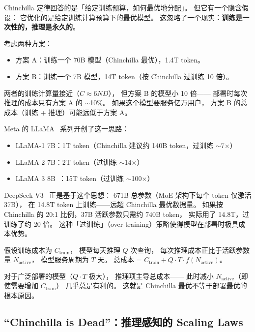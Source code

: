 Chinchilla 定律回答的是「给定训练预算，如何最优地分配」。
但它有一个隐含假设：
它优化的是给定训练计算预算下的最优模型。
这忽略了一个现实：\textbf{训练是一次性的，推理是永久的}。

考虑两种方案：
\begin{itemize}[noitemsep]
  \item 方案 A：训练一个 70B 模型（Chinchilla 最优），1.4T token。
  \item 方案 B：训练一个 7B 模型，14T token（按 Chinchilla 过训练 10 倍）。
\end{itemize}
两者的训练计算量接近（$C \approx 6ND$），
但方案 B 的模型小 10 倍——
部署时每次推理的成本只有方案 A 的 $\sim$10\%。
如果这个模型要服务亿万用户，
方案 B 的总成本（训练 + 推理）可能远低于方案 A。

Meta 的 LLaMA~\cite{touvron2023llama} 系列开创了这一思路：
\begin{itemize}[noitemsep]
  \item LLaMA-1 7B：1T token（Chinchilla 建议约 140B token，过训练 $\sim$7$\times$）
  \item LLaMA 2 7B：2T token（过训练 $\sim$14$\times$）
  \item LLaMA 3 8B~\cite{dubey2024llama3}：15T token（过训练 $\sim$100$\times$）
\end{itemize}

DeepSeek-V3~\cite{deepseekv3} 正是基于这个思想：
671B 总参数（MoE 架构下每个 token 仅激活 37B），
在 14.8T token 上训练——远超 Chinchilla 最优数据量。
如果按 Chinchilla 的 20:1 比例，37B 活跃参数只需约 740B token，
实际用了 14.8T，过训练了约 20 倍。
这种「过训练」（over-training）策略使得模型在部署时极具成本优势。

\begin{corebox}
假设训练成本为 $C_{\mathrm{train}}$，
模型每天推理 $Q$ 次查询，
每次推理成本正比于活跃参数量 $N_{\mathrm{active}}$，
模型服务周期为 $T$ 天。
总成本 =
$C_{\mathrm{train}} + Q \cdot T \cdot f(N_{\mathrm{active}})$。

对于广泛部署的模型（$Q \cdot T$ 极大），
推理项主导总成本——
此时减小 $N_{\mathrm{active}}$（即使需要增加 $C_{\mathrm{train}}$）
几乎总是有利的。
这就是 Chinchilla 最优不等于部署最优的根本原因。
\end{corebox}

\subsection{``Chinchilla is Dead''：推理感知的 Scaling Laws}
\label{sec:inference-aware-scaling}

